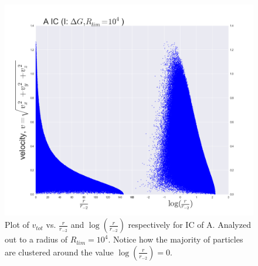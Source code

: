 \begin{figure}[!htbp]
\centering
\includegraphics[width=1.0\linewidth]{img/A_IC_v_logr_r2.png}
\caption{Plot of $v_{tot}$ vs. $\frac{r}{r_{-2}}$ and $\log (\frac{r}{r_{-2}})$ respectively for IC of A. Analyzed out to a radius of $R_{lim} = 10^4$. Notice how the majority of particles are clustered around the value $\log (\frac{r}{r_{-2}}) = 0$.}
\label{fig:test}
\end{figure}

